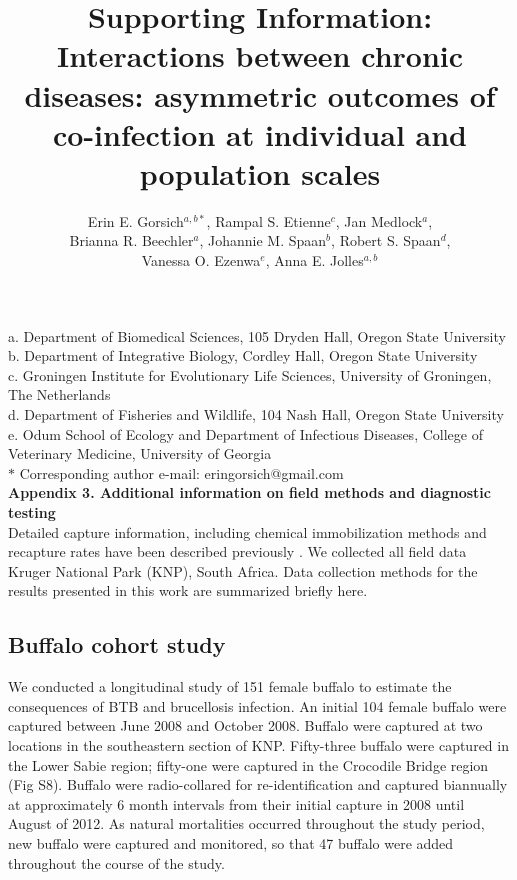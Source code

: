 \documentclass[11pt]{article}
\title{Supporting Information: \\
\textbf{Interactions between chronic diseases: 
asymmetric outcomes of co-infection at individual and population scales}}
\date{}
\author{Erin E. Gorsich$^{a,b*}$, Rampal S. Etienne$^{c}$, Jan Medlock$^{a}$, \\ Brianna R. Beechler$^{a}$, Johannie M. Spaan$^{b}$, Robert S. Spaan$^{d}$, \\Vanessa O. Ezenwa$^{e}$, Anna E. Jolles$^{a,b}$}
\begin{document}
\maketitle

\noindent{}a. Department of Biomedical Sciences, 105 Dryden Hall, Oregon State University \\
\noindent{}b. Department of Integrative Biology, Cordley Hall, Oregon State University \\
\noindent{}c. Groningen Institute for Evolutionary Life Sciences, University of Groningen, The Netherlands\\
\noindent{}d. Department of Fisheries and Wildlife, 104 Nash Hall, Oregon State University \\
\noindent{}e. Odum School of Ecology and Department of Infectious Diseases, College of Veterinary Medicine, University of Georgia \\
\noindent{}$ \ast$ Corresponding author e-mail: eringorsich@gmail.com \\



\noindent \Large{\textbf{Appendix 3. Additional information on field methods and diagnostic testing}}\\

Detailed capture information, including chemical immobilization methods and recapture rates have been described previously \cite{beechler_enemies_2015, gorsich_context-dependent_2015, ezenwa_opposite_2015}. We collected all field data Kruger National Park (KNP), South Africa. Data collection methods for the results presented in this work are summarized briefly here. 

\subsection*{Buffalo cohort study}
 We conducted a longitudinal study of 151 female buffalo to estimate the consequences of BTB and brucellosis infection. An initial 104 female buffalo were captured between June 2008 and October 2008. Buffalo were captured at two locations in the southeastern section of KNP. Fifty-three buffalo were captured in the Lower Sabie region; fifty-one were captured in the Crocodile Bridge region (Fig S8). Buffalo were radio-collared for re-identification and captured biannually at approximately 6 month intervals from their initial capture in 2008 until August of 2012. As natural mortalities occurred throughout the study period, new buffalo were captured and monitored, so that 47 buffalo were added throughout the course of the study.
 
\end{document}
